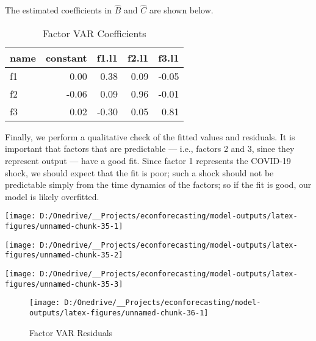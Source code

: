 \documentclass[11pt, letterpaper]{article}\usepackage[]{graphicx}\usepackage[]{color}
\begin{document}
The estimated coefficients in $\widehat{B}$ and $\widehat{C}$ are shown below.
\begin{table}[H]
\centering
\begingroup\footnotesize
\begin{tabular}{lrrrr}
  \hline
name & constant & f1.l1 & f2.l1 & f3.l1 \\ 
  \hline
f1 & 0.00 & 0.38 & 0.09 & -0.05 \\ 
  f2 & -0.06 & 0.09 & 0.96 & -0.01 \\ 
  f3 & 0.02 & -0.30 & 0.05 & 0.81 \\ 
   \hline
\end{tabular}
\endgroup
\caption{Factor VAR Coefficients} 
\end{table}



Finally, we perform a qualitative check of the fitted values and residuals. It is important that factors that are predictable --- i.e., factors 2 and 3, since they represent output --- have a good fit. Since factor 1 represents the COVID-19 shock, we should expect that the fit is poor; such a shock should not be predictable simply from the time dynamics of the factors; so if the fit is good, our model is likely overfitted.


{\centering \texttt{[image: D:/Onedrive/\_\_Projects/econforecasting/model-outputs/latex-figures/unnamed-chunk-35-1]} 

}




{\centering \texttt{[image: D:/Onedrive/\_\_Projects/econforecasting/model-outputs/latex-figures/unnamed-chunk-35-2]} 

}




{\centering \texttt{[image: D:/Onedrive/\_\_Projects/econforecasting/model-outputs/latex-figures/unnamed-chunk-35-3]} 

}





\begin{figure}[H]

{\centering \texttt{[image: D:/Onedrive/\_\_Projects/econforecasting/model-outputs/latex-figures/unnamed-chunk-36-1]} 

}

\caption[Factor VAR Residuals]{Factor VAR Residuals}\label{fig:unnamed-chunk-36}
\end{figure}
\end{document}
